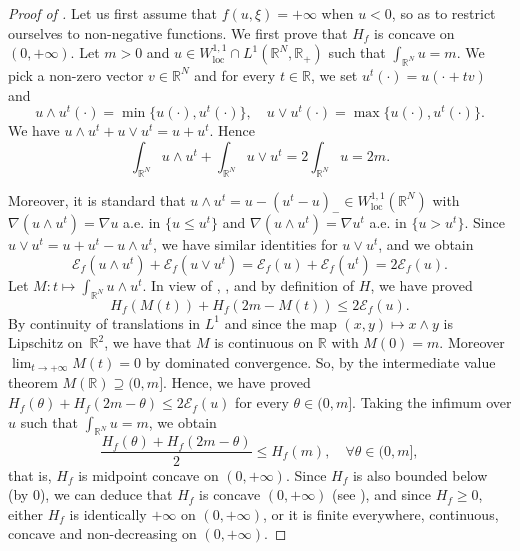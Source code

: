 \documentclass[10pt]{amsart}
\theoremstyle{plain}
\theoremstyle{definition}
\newcommand{\R}{\mathbb{R}}
\newcommand{\ener}{\mathcal{E}}
\newcommand{\loc}{\mathrm{loc}}
\begin{document}
\begin{proof}[Proof of ]
Let us first assume that $f(u,\xi) = +\infty$ when $u< 0$, so as to restrict ourselves to non-negative functions. We first prove that \(H_f\) is concave on \((0,+\infty)\).
Let \(m>0\) and \(u\in W^{1,1}_\loc\cap L^1(\R^N,\R_+)\) such that \(\int_{\R^N}u=m\). We pick a non-zero vector \(v\in\R^N\) and for every \(t\in\R\), we set \(u^t(\cdot)=u(\cdot+tv)\) and
\[
u\wedge u^t(\cdot)=\min\{u(\cdot),u^t(\cdot)\},\quad u\vee u^t(\cdot)=\max\{u(\cdot),u^t(\cdot)\}.
\]
We have \(u\wedge u^t+u\vee u^t=u+u^t\). Hence
\begin{equation}
\label{massAdditivity}
\int_{\R^N}u\wedge u^t+\int_{\R^N}u\vee u^t=2\int_{\R^N}u=2m.
\end{equation}

Moreover, it is standard that \(u\wedge u^t=u-(u^{t}-u)_-\in W^{1,1}_\loc(\R^N)\) with \(\nabla (u\wedge u^t)=\nabla u\) a.e. in \(\{u\leq u^t\}\) and \(\nabla (u\wedge u^t)=\nabla u^t\) a.e. in \(\{u>u^t\}\). Since \(u\vee u^t=u+u^t-u\wedge u^t\), we have similar identities for \(u\vee u^t\), and we obtain
\begin{equation}
\label{energyAdditivity}
\ener_f(u\wedge u^t)+\ener_f(u\vee u^t)=\ener_f(u)+\ener_f(u^t)=2\ener_f(u).
\end{equation}
Let \(M:t\mapsto\int_{\R^N}u\wedge u^t\). In view of , , and by definition of \(H\), we have proved
\begin{equation}
H_f(M(t))+H_f(2m-M(t))\leq 2\ener_f(u).
\end{equation}
By continuity of translations in \(L^1\) and since the map \((x,y)\mapsto x\wedge y\) is Lipschitz on~\(\R^2\), we have that \(M\) is continuous on \(\R\) with \(M(0)=m\). Moreover \(\lim_{t\to +\infty}M(t)=0\) by dominated convergence.
So, by the intermediate value theorem \(M(\R)\supseteq (0,m]\). Hence, we have proved \(H_f(\theta)+H_f(2m-\theta)\leq 2\ener_f(u)\) for every \(\theta\in(0,m]\). Taking the infimum over \(u\) such that \(\int_{\R^N}u=m\), we obtain
\[
\frac{H_f(\theta)+H_f(2m-\theta)}{2}\leq H_f(m),\quad \forall\theta\in(0,m],
\]
that is, \(H_f\) is midpoint concave on \((0,+\infty)\). Since \(H_f\) is also bounded below (by \(0\)), we can deduce that \(H_f\) is concave \((0,+\infty)\) (see \cite[\S 72]{robertsConvexFunctions1973}), and since $H_f \geq 0$, either $H_f$ is identically $+\infty$ on $(0,+\infty)$, or it is finite everywhere, continuous, concave and non-decreasing on $(0,+\infty)$.


\end{proof}
\end{document}

